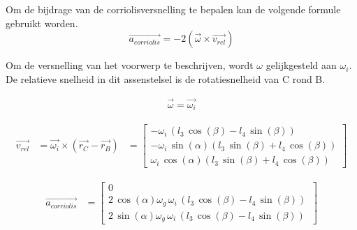 Om de bijdrage van de corriolisversnelling te bepalen kan de volgende formule gebruikt worden.
\begin{equation*}
\overrightarrow{a_{corriolis}}=-2(\overrightarrow{\omega}\times\overrightarrow{v_{rel}})
\end{equation*}

Om de versnelling van het voorwerp te beschrijven, wordt $\omega$ gelijkgesteld aan $\omega_{i}$. De relatieve snelheid in dit assenstelsel is de rotatiesnelheid van C rond B.

\begin{equation*}
\begin{split}
\overrightarrow{\omega}=\overrightarrow{\omega_{i}}
\end{split}
\end{equation*}

\begin{equation*}
\begin{split}
\overrightarrow{v_{rel}}&= \overrightarrow{\omega_{i}}\times(\overrightarrow{r_{C}}-\overrightarrow{r_{B}})
&=	\begin{bmatrix}
	-\omega_{i}\, \left( l_{3}\,\cos \left( \beta \right) -l_{4}\,\sin \left( \beta \right)  \right) \\
	-\omega_{i}\,\sin \left( \alpha \right)  \left( l_{3}\,\sin \left( \beta \right) +l_{4}\,\cos \left( \beta \right) \right) \\
	\omega_{i}\,\cos \left( \alpha \right) \left( l_{3}\,\sin \left( \beta \right) +l_{4}\,\cos \left( \beta\right)  \right) \
\end{bmatrix}
\end{split}
\end{equation*}

\begin{equation*}
\begin{split}
\overrightarrow{a_{corriolis}}&=
\begin{bmatrix}
0\\
2\,\cos \left( \alpha\right) \omega_{g}\,\omega_{i}\, \left( l_{3}\,\cos \left( \beta\right) -l_{4}\,\sin \left( \beta \right)  \right) \\
2\,\sin \left( \alpha \right) \omega_{g}\,\omega_{i}\, \left( l_{3}\,\cos \left( \beta \right) -l_{4}\,\sin \left( \beta \right)  \right) \
\end{bmatrix}
\end{split}
\end{equation*}